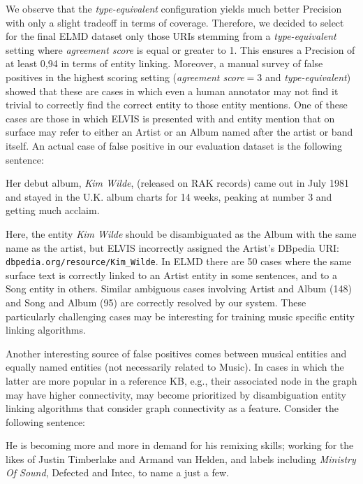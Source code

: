 We observe that the \textit{type-equivalent} configuration yields much better Precision with only a slight tradeoff in terms of coverage. Therefore, we decided to select for the final \textsc{ELMD} dataset only those URIs stemming from a \textit{type-equivalent} setting where \textit{agreement score} is equal or greater to 1. This ensures a Precision of at least 0,94 in terms of entity linking. Moreover, a manual survey of false positives in the highest scoring setting (\textit{agreement score}$=3$ and \textit{type-equivalent}) showed that these are cases in which even a human annotator may not find it trivial to correctly find the correct entity to those entity mentions. One of these cases are those in which \textsc{ELVIS} is presented with and entity mention that on surface may refer to either an Artist or an Album named after the artist or band itself. An actual case of false positive in our evaluation dataset is the following sentence:
\begin{adjustwidth}{2.5em}{20pt}
\begin{center}
Her debut album, \textit{Kim Wilde}, (released on RAK records) came out in July 1981 and stayed in the U.K. album charts for 14 weeks, peaking at number 3 and getting much acclaim.
\end{center}
\end{adjustwidth}

Here, the entity \textit{Kim Wilde} should be disambiguated as the Album with the same name as the artist, but \textsc{ELVIS} incorrectly assigned the Artist's DBpedia URI: {\footnotesize{\texttt{dbpedia.org/resource/Kim\_Wilde}}}. In \textsc{ELMD} there are 50 cases where the same surface text is correctly linked to an Artist entity in some sentences, and to a Song entity in others. Similar ambiguous cases involving Artist and Album (148) and Song and Album (95) are correctly resolved by our system. These particularly challenging cases may be interesting for training music specific entity linking algorithms.

Another interesting source of false positives comes between musical entities and equally named entities (not necessarily related to Music). In cases in which the latter are more popular in a reference KB, e.g., their associated node in the graph may have higher connectivity, may become prioritized by disambiguation entity linking algorithms that consider graph connectivity as a feature. Consider the following sentence:

\begin{adjustwidth}{2.5em}{20pt}
\begin{center}
He is becoming more and more in demand for his remixing skills; working for the likes of Justin Timberlake and Armand van Helden, and labels including \textit{Ministry Of Sound}, Defected and Intec, to name a just a few.
\end{center}
\end{adjustwidth}

